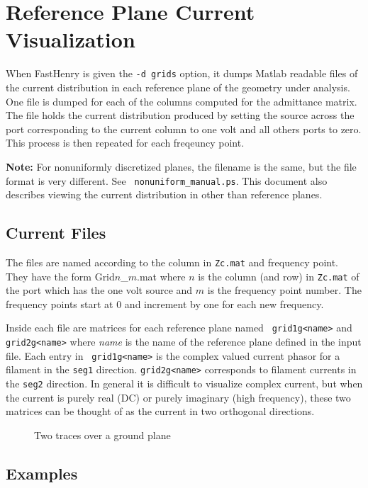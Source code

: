 \section{Reference Plane Current Visualization}
\label{viewcur}

When FastHenry is given the {\tt -d grids} option, it dumps Matlab
readable files of the current distribution in each reference plane of
the geometry under analysis.  One file is dumped for each of the
columns computed for the admittance matrix.  The file holds the
current distribution produced by setting the source across the port
corresponding to the current column to one volt and all others ports
to zero.  This process is then repeated for each freqeuncy point.

{\bf Note:} For nonuniformly discretized planes, the filename is the
same, but the file format is very different. See {\tt
  nonuniform\_manual.ps}. This document also describes viewing the current
distribution in other than reference planes.

\subsection{Current Files}
The files are named according to the column in {\tt Zc.mat} and frequency
point.  They have the form Grid$n$\_$m$.mat where $n$ is the column
(and row) in {\tt Zc.mat} of the port which has the one volt source
and $m$ is the frequency point number.  The frequency points start at
$0$ and increment by one for each new frequency.

Inside each file are matrices for each reference plane named {\tt
grid1g<name>} and \\ 
{\tt grid2g<name>} where {\em name} is the name of
the reference plane defined in the input file.  Each entry in {\tt
grid1g<name>} is the complex valued current phasor for a filament in
the {\tt seg1} direction.  {\tt grid2g<name>} corresponds to filament
currents in the {\tt seg2} direction.  In general it is difficult to
visualize complex current, but when the current is purely real (DC) or
purely imaginary (high frequency), these two matrices can be thought
of as the current in two orthogonal directions.

\begin{figure}
\centerline{
}
\caption{Two traces over a ground plane}
\label{together}
\end{figure}

\subsection{Examples}
        
